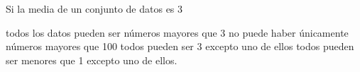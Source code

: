 \documentclass[10pt,letterpaper,addpoints]{exam}
\begin{document}
\begin{multicols}{2}
\begin{questions}
\begin{oneparchoices}
\end{oneparchoices}
\question Si la media de un conjunto de datos es 3
\begin{choices}
\choice todos los datos pueden ser números mayores que 3
\CorrectChoice no puede haber únicamente números mayores que 100
\choice todos pueden ser 3 excepto uno de ellos
\choice todos pueden ser menores que 1 excepto uno de ellos.
\end{choices}








\end{questions}
\end{multicols}
\end{document}
